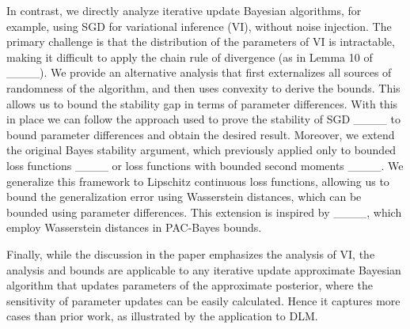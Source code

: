 In contrast, we directly analyze iterative update Bayesian algorithms, for example, using SGD for variational inference (VI), without noise injection. The primary challenge is that the distribution of the parameters of VI is intractable, making it difficult to apply the chain rule of divergence (as in Lemma 10 of ____). 
We provide an alternative analysis that first externalizes all sources of randomness of the algorithm, and then uses convexity to derive the bounds. 
This 
allows us to bound the stability gap in terms of parameter differences.
With this in place we can
follow the approach used to prove the stability of SGD ____ to bound parameter differences and obtain the desired result.  
Moreover, we extend the original Bayes stability argument, which previously applied only to bounded loss functions ____ or loss functions with bounded second moments ____. We generalize this framework to Lipschitz continuous loss functions, allowing us to bound the generalization error using Wasserstein distances, which can be bounded using parameter differences. This extension is inspired by ____, which employ Wasserstein distances in PAC-Bayes bounds.

Finally,
while the discussion in the paper emphasizes the analysis of VI, 
the analysis and bounds are applicable to any iterative update 
approximate Bayesian 
algorithm that updates parameters of the approximate posterior, where the sensitivity of parameter updates can be easily calculated.
Hence it captures more cases than prior work, as illustrated by the application to DLM.